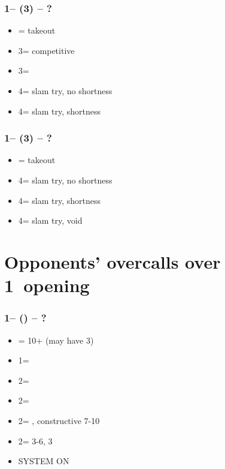 \documentclass[12pt, a4paper]{report}
\begin{document}
{{{            \subsubsection*{1\hearts -- (3\diams) -- ?}
            \begin{itemize}
                \item \dbl = takeout
                \item 3\hearts = competitive
                \item 3\spades = \spades\ \gf
                \item 4\clubs = slam try, no \diams shortness
                \item 4\diams = slam try, \diams shortness
            \end{itemize}

            \subsubsection*{1\hearts -- (3\spades) -- ?}
            \begin{itemize}
                \item \dbl = takeout
                \item 4\clubs = slam try, no \spades shortness
                \item 4\diams = slam try, \spades shortness
                \item 4\spades = slam try, \spades void
            \end{itemize}
        }

        \section*{\colorbox{blue!30}{Opponents' overcalls over 1\spades\ opening}}
         {

            \subsubsection*{1\spades -- (\dbl) -- ?}
            \begin{itemize}
                \item \rdbl = 10+ (may have 3\spades)
                \item 1\nt = \trsf{2\clubs}
                \item 2\clubs = \trsf{2\diams}
                \item 2\diams = \trsf{2\hearts}
                \item 2\hearts = \trsf{2\spades}, constructive 7-10
                \item 2\spades = 3-6, 3\spades
                \item \small{SYSTEM ON}
            \end{itemize}

}}}
\end{document}
